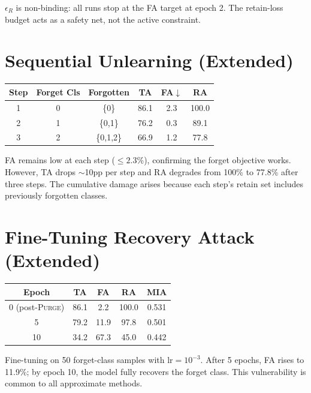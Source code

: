 \documentclass[letterpaper]{article}
\newcommand{\ours}{\textsc{Purge}}
\begin{document}
$\epsilon_R$ is non-binding: all runs stop at the FA target at epoch 2. The retain-loss budget acts as a safety net, not the active constraint.

\section{Sequential Unlearning (Extended)}

\begin{center}
\small
\begin{tabular}{cccccc}
\toprule
Step & Forget Cls & Forgotten & TA & FA$\downarrow$ & RA \\
\midrule
1 & 0 & \{0\} & 86.1 & 2.3 & 100.0 \\
2 & 1 & \{0,1\} & 76.2 & 0.3 & 89.1 \\
3 & 2 & \{0,1,2\} & 66.9 & 1.2 & 77.8 \\
\bottomrule
\end{tabular}
\end{center}

FA remains low at each step ($\le 2.3$\%), confirming the forget objective works. However, TA drops $\sim$10pp per step and RA degrades from 100\% to 77.8\% after three steps. The cumulative damage arises because each step's retain set includes previously forgotten classes.

\section{Fine-Tuning Recovery Attack (Extended)}

\begin{center}
\small
\begin{tabular}{ccccc}
\toprule
Epoch & TA & FA & RA & MIA \\
\midrule
0 (post-\ours{}) & 86.1 & 2.2 & 100.0 & 0.531 \\
5 & 79.2 & 11.9 & 97.8 & 0.501 \\
10 & 34.2 & 67.3 & 45.0 & 0.442 \\
\bottomrule
\end{tabular}
\end{center}

Fine-tuning on 50 forget-class samples with $\mathrm{lr} = 10^{-3}$. After 5 epochs, FA rises to 11.9\%; by epoch 10, the model fully recovers the forget class. This vulnerability is common to all approximate methods.
\end{document}
